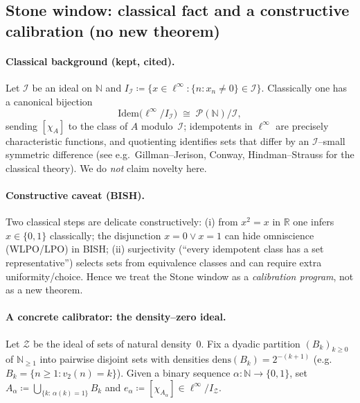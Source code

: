 \documentclass[11pt]{article}
\theoremstyle{definition}
\theoremstyle{remark}
\begin{document}
\subsection{Stone window: classical fact and a constructive calibration (no new theorem)}
\label{subsec:stone-window}

\paragraph{Classical background (kept, cited).}
Let $\mathcal I$ be an ideal on $\mathbb N$ and
$I_{\mathcal I} \coloneqq \{x\in \ell^\infty : \{n : x_n\neq 0\}\in \mathcal I\}$.
Classically one has a canonical bijection
\[
  \mathrm{Idem}\bigl(\ell^\infty / I_{\mathcal I}\bigr)
  \;\cong\;
  \mathcal P(\mathbb N)/\mathcal I,
\]
sending $[\chi_A]$ to the class of $A$ modulo~$\mathcal I$; idempotents in $\ell^\infty$ are precisely characteristic functions, and quotienting identifies sets that differ by an $\mathcal I$--small symmetric difference
(see e.g.\ Gillman--Jerison, Conway, Hindman--Strauss for the classical theory). We do \emph{not} claim novelty here.

\paragraph{Constructive caveat (BISH).}
Two classical steps are delicate constructively:
(i) from $x^2=x$ in $\mathbb R$ one infers $x\in\{0,1\}$ classically; the disjunction $x=0\vee x=1$
can hide omniscience (WLPO/LPO) in BISH;
(ii) surjectivity (``every idempotent class has a set representative'') selects sets from equivalence classes and can require extra uniformity/choice.
Hence we treat the Stone window as a \emph{calibration program}, not as a new theorem.

\paragraph{A concrete calibrator: the density--zero ideal.}
Let $\mathcal Z$ be the ideal of sets of natural density~$0$.
Fix a dyadic partition $(B_k)_{k\ge 0}$ of $\mathbb N_{\ge 1}$ into pairwise disjoint sets with densities
$\mathrm{dens}(B_k)=2^{-(k+1)}$ (e.g.\ $B_k=\{n\ge1: v_2(n)=k\}$).
Given a binary sequence $\alpha:\mathbb N\to\{0,1\}$, set
$A_\alpha \coloneqq \bigcup_{\{k:\,\alpha(k)=1\}} B_k$ and $e_\alpha\coloneqq [\chi_{A_\alpha}]\in \ell^\infty/I_{\mathcal Z}$.
\end{document}
